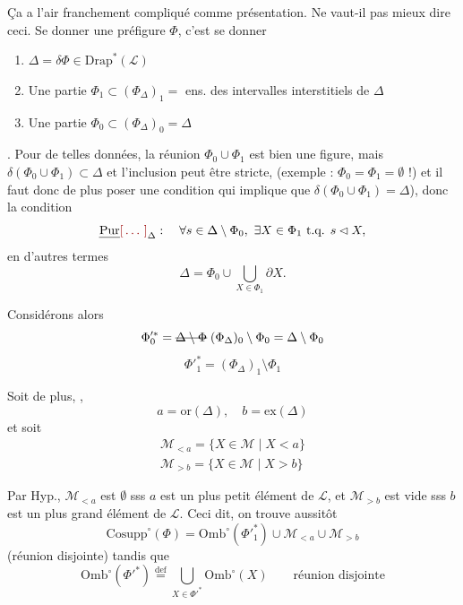 \documentclass[11pt,a4paper]{article}
\begin{document}

Ça a l'air franchement compliqué comme présentation. Ne vaut-il pas mieux dire ceci. Se donner une préfigure $\Phi$, c'est se donner
\begin{enumerate}
  \item[1°)] $\Delta = \delta\Phi \in \mathrm{Drap}^*(\mathcal{L})$
  \item[2°)] Une partie $\Phi_1 \subset (\Phi_\Delta)_1 =$ ens. des intervalles interstitiels de $\Delta$
  \item[3°)] Une partie $\Phi_0 \subset (\Phi_\Delta)_0 = \Delta$
\end{enumerate}


. Pour de telles données, la réunion $\Phi_0 \cup \Phi_1$ est bien une figure, mais $\delta(\Phi_0 \cup \Phi_1) \subset \Delta$ et l'inclusion peut être stricte, (exemple : $\Phi_0 = \Phi_1 = \emptyset$ !) et il faut donc de plus poser une condition qui implique que $\delta(\Phi_0 \cup \Phi_1) = \Delta$), donc  la condition
\[
  \text{\uncertain{Pur}\ill{}}_\Delta : \quad \forall s \in \Delta \setminus \Phi_0 ,\ \exists X \in \Phi_1 \text{ t.q. } s \lhd X ,
\]
en d'autres termes
\[
  \Delta = \Phi_0 \cup \bigcup_{X \in \Phi_1} \partial X .
\]


Considérons alors
\[
  \Phi'^*_0 = \text{\struck{$\Delta \setminus \Phi$}}\; (\Phi_\Delta)_0 \setminus \Phi_0 = \Delta \setminus \Phi_0
\]
\[
  \Phi'^*_1 = (\Phi_\Delta)_1 \setminus \Phi_1
\]

Soit de plus, ,
\[
  a = \mathrm{or}(\Delta) , \quad b = \mathrm{ex}(\Delta)
\]
et soit
\[
  \begin{gathered}
    \mathcal{M}_{<a} = \{ X \in \mathcal{M} \mid X < a \} \\
    \mathcal{M}_{>b} = \{ X \in \mathcal{M} \mid X > b \}
  \end{gathered}
\]

Par Hyp., $\mathcal{M}_{<a}$ est $\emptyset$ sss $a$ est un plus petit élément de $\mathcal{L}$, et $\mathcal{M}_{>b}$ est vide sss $b$ est un plus grand élément de $\mathcal{L}$. Ceci dit, on trouve aussitôt
\[
  \mathrm{Cosupp}^\circ(\Phi) = \mathrm{Omb}^\circ(\Phi'^*_1) \cup \mathcal{M}_{<a} \cup \mathcal{M}_{>b}
\]
(réunion disjointe) tandis que
\[
  \mathrm{Omb}^\circ(\Phi'^*) \overset{\mathrm{def}}{=} \bigcup_{X \in \Phi'^*} \mathrm{Omb}^\circ(X) \qquad \text{réunion disjointe}
\]
\end{document}
